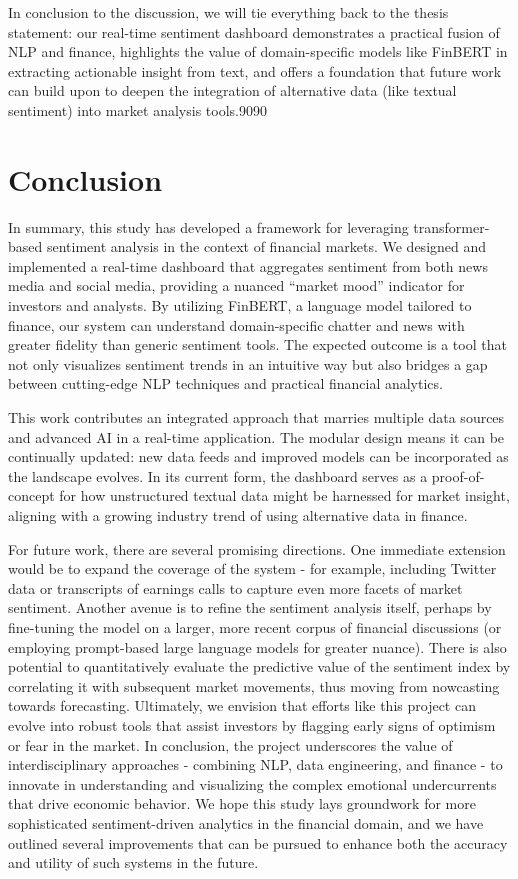 \documentclass[12pt]{article}
\begin{document}
In conclusion to the discussion, we will tie everything back to the thesis statement: our real-time sentiment
dashboard demonstrates a practical fusion of NLP and finance, highlights the value of domain-specific models
like FinBERT in extracting actionable insight from text, and offers a foundation that future work can build
upon to deepen the integration of alternative data (like textual sentiment) into market analysis tools.9090

\section{Conclusion}
In summary, this study has developed a framework for leveraging transformer-based sentiment analysis in the
context of financial markets. We designed and implemented a real-time dashboard that aggregates sentiment
from both news media and social media, providing a nuanced “market mood” indicator for investors and
analysts. By utilizing FinBERT, a language model tailored to finance, our system can understand
domain-specific chatter and news with greater fidelity than generic sentiment tools. The expected outcome is
a tool that not only visualizes sentiment trends in an intuitive way but also bridges a gap between
cutting-edge NLP techniques and practical financial analytics.

This work contributes an integrated approach that marries multiple data sources and advanced AI in a
real-time application. The modular design means it can be continually updated: new data feeds and improved
models can be incorporated as the landscape evolves. In its current form, the dashboard serves as a
proof-of-concept for how unstructured textual data might be harnessed for market insight, aligning with a
growing industry trend of using alternative data in finance.

For future work, there are several promising directions. One immediate extension would be to expand the
coverage of the system - for example, including Twitter data or transcripts of earnings calls to capture even
more facets of market sentiment. Another avenue is to refine the sentiment analysis itself, perhaps by
fine-tuning the model on a larger, more recent corpus of financial discussions (or employing prompt-based
large language models for greater nuance). There is also potential to quantitatively evaluate the predictive
value of the sentiment index by correlating it with subsequent market movements, thus moving from nowcasting
towards forecasting. Ultimately, we envision that efforts like this project can evolve into robust tools that
assist investors by flagging early signs of optimism or fear in the market. In conclusion, the project
underscores the value of interdisciplinary approaches - combining NLP, data engineering, and finance - to
innovate in understanding and visualizing the complex emotional undercurrents that drive economic behavior.
We hope this study lays groundwork for more sophisticated sentiment-driven analytics in the financial domain,
and we have outlined several improvements that can be pursued to enhance both the accuracy and utility of
such systems in the future.




\end{document}
